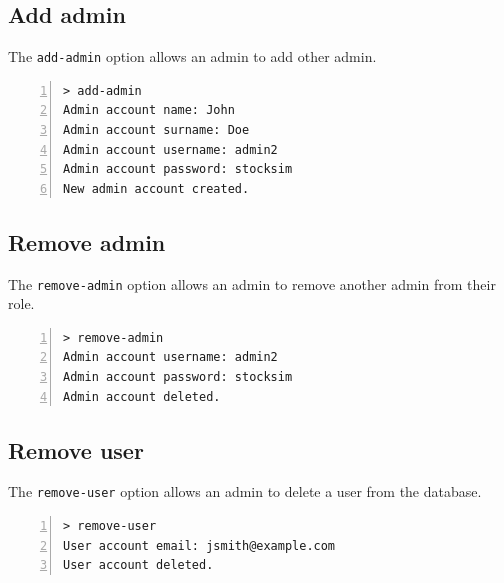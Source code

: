 \subsection{Add admin}
The \texttt{add-admin} option allows an admin to add other admin.
\begin{lstlisting}[basicstyle=\footnotesize\ttfamily,language={},numbers=left,keepspaces=true,tabsize=4,
numberstyle=\footnotesize,numbersep=8pt,frame=single]
> add-admin
Admin account name: John
Admin account surname: Doe
Admin account username: admin2
Admin account password: stocksim
New admin account created.
\end{lstlisting}

\subsection{Remove admin}

The \texttt{remove-admin} option allows an admin to remove another admin from their role.

\begin{lstlisting}[basicstyle=\footnotesize\ttfamily,language={},numbers=left,keepspaces=true,tabsize=4,
numberstyle=\footnotesize,numbersep=8pt,frame=single]
> remove-admin
Admin account username: admin2
Admin account password: stocksim
Admin account deleted.
\end{lstlisting}

\subsection{Remove user}
The \texttt{remove-user} option allows an admin to delete a user from the database.

\begin{lstlisting}[basicstyle=\footnotesize\ttfamily,language={},numbers=left,keepspaces=true,tabsize=4,
numberstyle=\footnotesize,numbersep=8pt,frame=single]
> remove-user
User account email: jsmith@example.com
User account deleted.
\end{lstlisting}

